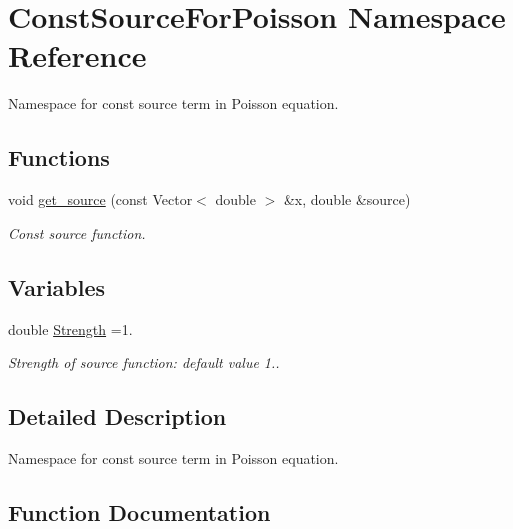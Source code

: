 \hypertarget{namespaceConstSourceForPoisson}{}\section{Const\+Source\+For\+Poisson Namespace Reference}
\label{namespaceConstSourceForPoisson}


Namespace for const source term in Poisson equation.  


\subsection*{Functions}
\begin{DoxyCompactItemize}
\item 
void \hyperlink{namespaceConstSourceForPoisson_a40ef79083874b58ed42b4df2ca0f4c10}{get\+\_\+source} (const Vector$<$ double $>$ \&x, double \&source)
\begin{DoxyCompactList}\small\item\em Const source function. \end{DoxyCompactList}\end{DoxyCompactItemize}
\subsection*{Variables}
\begin{DoxyCompactItemize}
\item 
double \hyperlink{namespaceConstSourceForPoisson_add351c5acab2561d68d1fc9ec3d5fc5e}{Strength} =1.
\begin{DoxyCompactList}\small\item\em Strength of source function\+: default value 1.. \end{DoxyCompactList}\end{DoxyCompactItemize}


\subsection{Detailed Description}
Namespace for const source term in Poisson equation. 

\subsection{Function Documentation}
\mbox{\label{namespaceConstSourceForPoisson_a40ef79083874b58ed42b4df2ca0f4c10}} 

